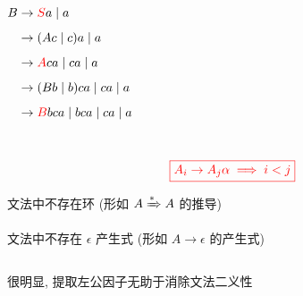 \begin{frame}{}
  \begin{columns}
	  
	  \pause
		\begin{align*}
			B &\to \textcolor{red}{S}a \mid a \\[5pt]
			  &\to (Ac \mid c) a \mid a \\[5pt]
			&\to \textcolor{red}{A}ca \mid ca \mid a \\[5pt]
			&\to (Bb \mid b) ca \mid ca \mid a \\[5pt]
			&\to \textcolor{red}{B}bca \mid bca \mid ca \mid a \\[5pt]
		\end{align*}
  \end{columns}

  \pause
  \vspace{-0.50cm}
  

  \pause
  \[
    \textcolor{red}{\boxed{A_{i} \to A_{j} \alpha \implies i < j}}
  \]
\end{frame}

\begin{frame}{}
  \begin{center}

    \vspace{0.50cm}
    文法中不存在环 (形如 $A \xRightarrow[]{\ast} A$ 的推导)

    \vspace{0.50cm}
	文法中不存在 $\epsilon$ 产生式 (形如 $A \to \epsilon$ 的产生式)
  \end{center}

  \pause
  
\end{frame}

\begin{frame}{}
  \begin{center}

    \vspace{0.30cm}

  \end{center}
\end{frame}

\begin{frame}{}
  \begin{center}
    \begin{columns}
    \end{columns}

    \vspace{1.00cm}
    很明显, 提取左公因子无助于消除文法二义性
  \end{center}
\end{frame}
